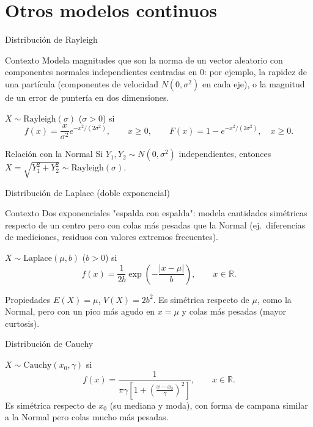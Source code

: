 \documentclass[aspectratio=169,11pt]{beamer}
\begin{document}
\section{Otros modelos continuos}

\begin{frame}{Distribución de Rayleigh}
\begin{block}{Contexto}
Modela magnitudes que son la norma de un vector aleatorio con componentes normales independientes centradas en $0$: por ejemplo, la rapidez de una partícula (componentes de velocidad $N(0,\sigma^2)$ en cada eje), o la magnitud de un error de puntería en dos dimensiones.
\end{block}

\begin{definition}
$X\sim\text{Rayleigh}(\sigma)$ ($\sigma>0$) si
$$f(x) = \frac{x}{\sigma^2}e^{-x^2/(2\sigma^2)}, \qquad x\ge 0, \qquad F(x) = 1-e^{-x^2/(2\sigma^2)}, \quad x\ge0.$$
\end{definition}

\begin{alertblock}{Relación con la Normal}
Si $Y_1,Y_2\sim N(0,\sigma^2)$ independientes, entonces $X=\sqrt{Y_1^2+Y_2^2}\sim\text{Rayleigh}(\sigma)$.
\end{alertblock}
\end{frame}

\begin{frame}{Distribución de Laplace (doble exponencial)}
\begin{block}{Contexto}
Dos exponenciales "espalda con espalda": modela cantidades simétricas respecto de un centro pero con colas más pesadas que la Normal (ej.\ diferencias de mediciones, residuos con valores extremos frecuentes).
\end{block}

\begin{definition}
$X\sim\text{Laplace}(\mu,b)$ ($b>0$) si
$$f(x) = \frac{1}{2b}\exp\left(-\frac{|x-\mu|}{b}\right), \qquad x\in\mathbb{R}.$$
\end{definition}

\begin{alertblock}{Propiedades}
$E(X)=\mu$, $V(X)=2b^2$. Es simétrica respecto de $\mu$, como la Normal, pero con un pico más agudo en $x=\mu$ y colas más pesadas (mayor curtosis).
\end{alertblock}
\end{frame}

\begin{frame}{Distribución de Cauchy}
\begin{definition}
$X\sim\text{Cauchy}(x_0,\gamma)$ si
$$f(x) = \frac{1}{\pi\gamma\left[1+\left(\frac{x-x_0}{\gamma}\right)^2\right]}, \qquad x\in\mathbb{R}.$$
Es simétrica respecto de $x_0$ (su mediana y moda), con forma de campana similar a la Normal pero colas mucho más pesadas.
\end{definition}
\end{frame}
\end{document}
